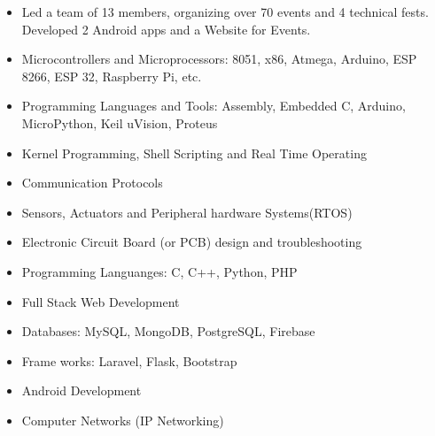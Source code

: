 \documentclass[10pt,a4paper,ragged2e,normalphoto]{altacv}
\begin{document}
\begin{itemize}
\item Led a team of 13 members, organizing over 70 events and 4 technical fests. Developed 2 Android apps and a Website for Events.
\end{itemize}



\smallskip
{}
\begin{itemize}
\item {\color{Highlighter} Microcontrollers and Microprocessors:} 8051, x86, Atmega, Arduino, ESP 8266, ESP 32, Raspberry Pi, etc.
\item {\color{Highlighter} Programming Languages and Tools:} Assembly, Embedded C, Arduino, MicroPython, Keil uVision, Proteus
\item Kernel Programming, Shell Scripting and Real Time Operating
\item Communication Protocols
\item Sensors, Actuators and Peripheral hardware
Systems(RTOS)
\item Electronic Circuit Board (or PCB) design and troubleshooting
\end{itemize}
\smallskip

\begin{itemize}
\item {\color{Highlighter} Programming Languanges:} C, C++, Python, PHP
\item Full Stack Web Development
\item {\color{Highlighter} Databases:} MySQL, MongoDB, PostgreSQL, Firebase
\item {\color{Highlighter} Frame works:} Laravel, Flask, Bootstrap
\item Android Development
\item Computer Networks (IP Networking)
\end{itemize}


\end{document}
